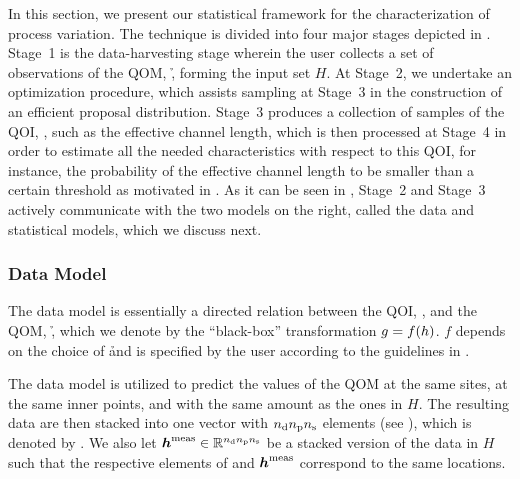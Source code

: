 In this section, we present our statistical framework for the characterization
of process variation. The technique is divided into four major stages depicted
in . Stage~1 is the data-harvesting stage wherein the user
collects a set of observations of the \ac{QOM}, \h, forming the input set $H$.
At Stage~2, we undertake an optimization procedure, which assists 
sampling at Stage~3 in the construction of an efficient proposal distribution.
Stage~3 produces a collection of samples of the \ac{QOI}, \g, such as the
effective channel length, which is then processed at Stage~4 in order to
estimate all the needed characteristics with respect to this \ac{QOI}, for
instance, the probability of the effective channel length to be smaller than a
certain threshold as motivated in . As it can be seen in
, Stage~2 and Stage~3 actively communicate with the two models
on the right, called the data and statistical models, which we discuss next.

\subsubsection{Data Model}

The data model is essentially a directed relation between the \ac{QOI}, \g, and
the \ac{QOM}, \h, which we denote by the ``black-box'' transformation $g =
f(h)$. $f$ depends on the choice of \h and is specified by the user according
to the guidelines in .

The data model is utilized to predict the values of the \ac{QOM} at the same
sites, at the same inner points, and with the same amount as the ones in $H$.
The resulting data are then stacked into one vector with ${n_\mathrm{d}} {n_\mathrm{p}} {n_\mathrm{s}}$ elements
(see ), which is denoted by \vh. We also let
$\boldsymbol{h}^{\mathrm{meas}} \in \mathbb{R}^{{n_\mathrm{d}} {n_\mathrm{p}} {n_\mathrm{s}}}$ be a stacked version of the data in $H$
such that the respective elements of \vh and $\boldsymbol{h}^{\mathrm{meas}}$ correspond to the
same locations.


